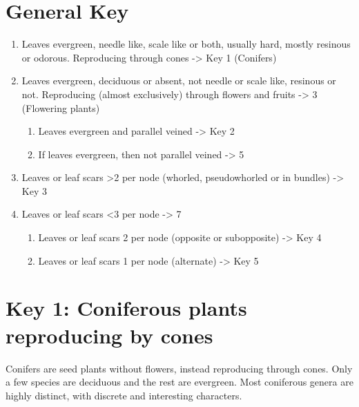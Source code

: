 \documentclass[openany]{book}
\providecommand{\tightlist}{%
  \setlength{\itemsep}{0pt}\setlength{\parskip}{0pt}}
\begin{document}
\hypertarget{general-key-1}{%
\section{General Key}\label{general-key-1}}

\begin{enumerate}
\def\labelenumi{\arabic{enumi}.}
\item
  Leaves evergreen, needle like, scale like or both, usually hard,
  mostly resinous or odorous. Reproducing through cones -\textgreater{}
  Key 1 (Conifers)
\item
  Leaves evergreen, deciduous or absent, not needle or scale like,
  resinous or not. Reproducing (almost exclusively) through flowers and
  fruits -\textgreater{} 3 (Flowering plants)

  \begin{enumerate}
  \def\labelenumii{\arabic{enumii}.}
  \setcounter{enumii}{2}
  \tightlist
  \item
    Leaves evergreen and parallel veined -\textgreater{} Key 2
  \item
    If leaves evergreen, then not parallel veined -\textgreater{} 5
  \end{enumerate}
\item
  Leaves or leaf scars \textgreater{}2 per node (whorled, pseudowhorled
  or in bundles) -\textgreater{} Key 3
\item
  Leaves or leaf scars \textless{}3 per node -\textgreater{} 7

  \begin{enumerate}
  \def\labelenumii{\arabic{enumii}.}
  \setcounter{enumii}{6}
  \tightlist
  \item
    Leaves or leaf scars 2 per node (opposite or subopposite)
    -\textgreater{} Key 4
  \item
    Leaves or leaf scars 1 per node (alternate) -\textgreater{} Key 5
  \end{enumerate}
\end{enumerate}

\hypertarget{key-1-coniferous-plants-reproducing-by-cones-1}{%
\section{Key 1: Coniferous plants reproducing by
cones}\label{key-1-coniferous-plants-reproducing-by-cones-1}}

Conifers are seed plants without flowers, instead reproducing through
cones. Only a few species are deciduous and the rest are evergreen. Most
coniferous genera are highly distinct, with discrete and interesting
characters.
\end{document}
